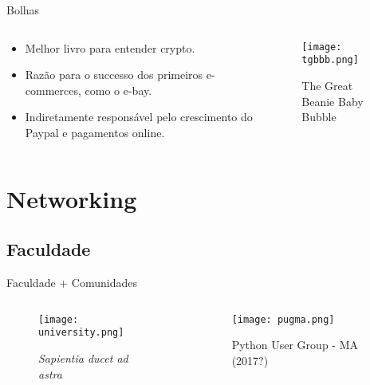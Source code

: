 \documentclass{beamer}
\begin{document}
  \begin{frame}{Bolhas}
    \begin{columns}
        \begin{column}{0.5\textwidth}
            \begin{itemize}[<+->]
                \item<2-> Melhor livro para entender crypto.
                \item<3-> Razão para o successo dos primeiros e-commerces, como o e-bay.
                \item<4-> Indiretamente responsável pelo crescimento do Paypal e pagamentos online.
            \end{itemize}
        \end{column}
        \begin{column}{0.5\textwidth}
            \begin{figure}
            \centering
                \texttt{[image: tgbbb.png]}
                \caption{The Great Beanie Baby Bubble}
            \end{figure}
        \end{column}
    \end{columns}
  \end{frame}

  \section{Networking}
  \subsection{Faculdade}
  \begin{frame}{Faculdade + Comunidades}
    \begin{columns}
        \begin{column}{0.5\textwidth}
            \begin{figure}
            \centering
                \texttt{[image: university.png]}
                \caption{\textit{Sapientia ducet ad astra}}
            \end{figure}
        \end{column}
        \begin{column}{0.5\textwidth}
            \begin{figure}
            \centering
                \texttt{[image: pugma.png]}
                \caption{ Python User Group - MA (2017?)}
            \end{figure}
        \end{column}
    \end{columns}

  \end{frame}
\end{document}
